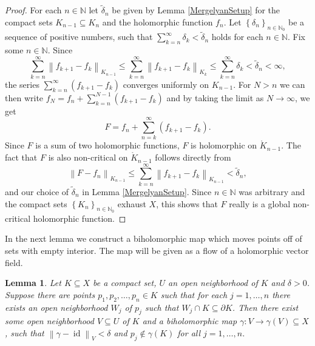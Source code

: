 \documentclass[a4paper,11pt]{amsart}
\newcommand{\N}{\mathbb N}
\newcommand{\set}[1]{\left\{#1\right\}}
\newcommand{\norm}[1]{\left\lVert#1\right\rVert}
\DeclareMathOperator{\id}{id}
\newtheorem{lemma}{Lemma}
\begin{document}
\begin{proof} 
    For each $n \in \N$ let $\tilde{\delta}_n$ be given by Lemma \ref{MergelyanSetup} for the compact sets $K_{n-1} \subseteq K_n$ and the holomorphic function $f_n$.
    Let $\set{\delta_n}_{n \in \N_0}$ be a sequence of positive numbers, such that $\sum_{k=n}^\infty \delta_k < \tilde{\delta}_n$ holds for each $n \in \N$.
    Fix some $n \in \N$. Since 
    \[\sum_{k=n}^{\infty} \norm{f_{k+1}-f_k}_{K_{n-1}} \le \sum_{k=n}^{\infty} \norm{f_{k+1}-f_k}_{K_k} \le \sum_{k=n}^{\infty} \delta_k < \tilde{\delta}_n < \infty,\]
    the series $\sum_{k=n}^{\infty} (f_{k+1}-f_k)$ converges uniformly on $K_{n-1}$.
    For $N > n$ we can then write $f_N = f_n + \sum_{k=n}^{N-1} (f_{k+1}-f_k)$ and by taking the limit as $N \to \infty$, we get
    \[F = f_n + \sum_{n=k}^{\infty} (f_{k+1}-f_k).\]
    Since $F$ is a sum of two holomorphic functions, $F$ is holomorphic on $\mathring{K}_{n-1}$.
    The fact that $F$ is also non-critical on $\mathring{K}_{n-1}$ follows directly from 
    \[\norm{F - f_n}_{K_{n-1}} \le \sum_{k=n}^{\infty} \norm{f_{k+1}-f_k}_{K_{n-1}} < \tilde{\delta}_n,\]
    and our choice of $\tilde{\delta}_n$ in Lemma \ref{MergelyanSetup}.
    Since $n \in \N$ was arbitrary and the compact sets $\set{K_n}_{n \in \N_0}$ exhaust $X$, 
    this shows that $F$ really is a global non-critical holomorphic function.
\end{proof}

In the next lemma we construct a biholomorphic map which moves points off of sets with empty interior.
The map will be given as a flow of a holomorphic vector field.

\begin{lemma}\label{bigMove}
    Let $K \subseteq X$ be a compact set, $U$ an open neighborhood of $K$ and $\delta > 0$.
    Suppose there are points $p_1, p_2, \ldots, p_n \in K$ such that for each $j = 1,\ldots, n$ there exists an open neighborhood $W_j$ of $p_j$ such that $W_j \cap K \subseteq \partial K$. 
    Then there exist some open neighborhood $V \subseteq U$ of $K$ and a biholomorphic map $\gamma \colon V \to \gamma(V) \subseteq X$, 
    such that $\norm{\gamma - \id}_V < \delta$ and $p_j \notin \gamma(K)$ for all $j = 1,\ldots, n$.
\end{lemma}
\end{document}
